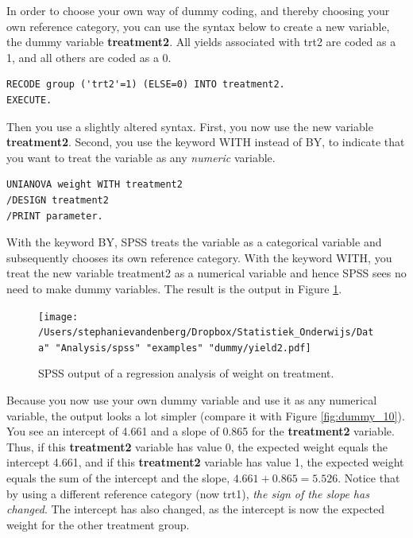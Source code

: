 \documentclass[]{report}\usepackage[]{graphicx}\usepackage[]{color}
\begin{document}
In order to choose your own way of dummy coding, and thereby choosing your own reference category, you can use the syntax below to create a new variable, the dummy variable \textbf{treatment2}. All yields associated with trt2 are coded as a 1, and all others are coded as a 0.

\begin{verbatim}
RECODE group ('trt2'=1) (ELSE=0) INTO treatment2.
EXECUTE.
\end{verbatim}

Then you use a slightly altered syntax. First, you now use the new variable \textbf{treatment2}. Second, you use the keyword WITH instead of BY, to indicate that you want to treat the variable as any \textit{numeric} variable.

\begin{verbatim}
UNIANOVA weight WITH treatment2 
/DESIGN treatment2
/PRINT parameter.
\end{verbatim}

With the keyword BY, SPSS treats the variable as a categorical variable and subsequently chooses its own reference category. With the keyword WITH, you treat the new variable treatment2 as a numerical variable and hence SPSS sees no need to make dummy variables. The result is the output in Figure \ref{fig:dummy_11}.


\begin{figure}[h]
    \begin{center}
       \texttt{[image: /Users/stephanievandenberg/Dropbox/Statistiek\_Onderwijs/Data" "Analysis/spss" "examples" "dummy/yield2.pdf]}
    \end{center}
 \caption{SPSS output of a regression analysis of weight on treatment.}
 \label{fig:dummy_11}
\end{figure}

Because you now use your own dummy variable and use it as any numerical variable, the output looks a lot simpler (compare it with Figure \ref{fig:dummy_10}). You see an intercept of 4.661 and a slope of 0.865 for the \textbf{treatment2} variable. Thus, if this \textbf{treatment2} variable has value 0, the expected weight equals the intercept 4.661, and if this \textbf{treatment2} variable has value 1, the expected weight equals the sum of the intercept and the slope, $4.661 + 0.865 = 5.526$. Notice that by using a different reference category (now trt1), \textit{the sign of the slope has changed}. The intercept has also changed, as the intercept is now the expected weight for the other treatment group. 
\end{document}

